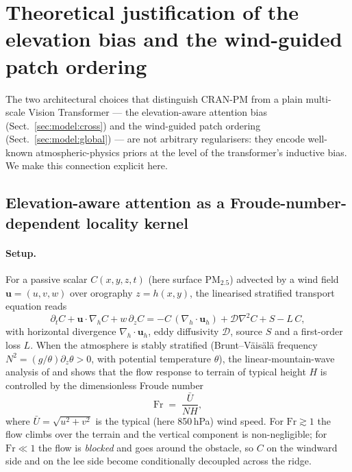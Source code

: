 
\section{Theoretical justification of the elevation bias and the
wind-guided patch ordering}
\label{app:theory}

The two architectural choices that distinguish CRAN-PM from a plain
multi-scale Vision Transformer — the elevation-aware attention bias
(Sect.~\ref{sec:model:cross}) and the wind-guided patch ordering
(Sect.~\ref{sec:model:global}) — are not arbitrary regularisers: they
encode well-known atmospheric-physics priors at the level of the
transformer's inductive bias. We make this connection explicit here.

\subsection{Elevation-aware attention as a Froude-number-dependent
locality kernel}
\label{app:theory:elev}

\paragraph{Setup.}
For a passive scalar $C(x,y,z,t)$ (here surface PM$_{2.5}$) advected by
a wind field $\mathbf{u}=(u,v,w)$ over orography $z=h(x,y)$, the
linearised stratified transport equation reads
\begin{equation}
\partial_t C + \mathbf{u}\cdot\nabla_h C + w\,\partial_z C
= - C\,(\nabla_h\cdot\mathbf{u}_h)  + \mathcal{D}\nabla^2 C
+ S - L\,C,
\label{eq:transport}
\end{equation}
with horizontal divergence $\nabla_h\cdot\mathbf{u}_h$, eddy diffusivity
$\mathcal{D}$, source $S$ and a first-order loss $L$. When the
atmosphere is stably stratified (Brunt--V\"ais\"al\"a frequency
$N^2 = (g/\theta)\partial_z\theta > 0$, with potential temperature
$\theta$), the linear-mountain-wave analysis of \citet{queney1948} and
\citet{smith1979} shows that the flow response to terrain of typical
height $H$ is controlled by the dimensionless Froude number
\begin{equation}
\mathrm{Fr} \;=\; \frac{\bar{U}}{N H},
\label{eq:froude}
\end{equation}
where $\bar{U}=\sqrt{u^2+v^2}$ is the typical (here 850\,hPa) wind
speed. For $\mathrm{Fr}\gtrsim 1$ the flow climbs over the terrain
and the vertical component is non-negligible; for
$\mathrm{Fr}\ll 1$ the flow is \emph{blocked} and goes around the
obstacle, so $C$ on the windward side and on the lee side become
conditionally decoupled across the ridge.

